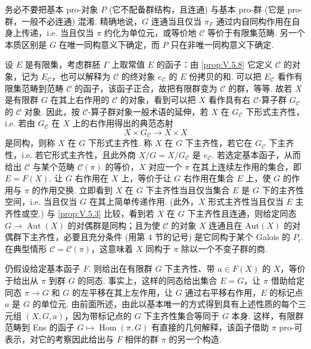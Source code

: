 \begin{remark}\label{rem:V.5.11}
务必不要把基本 pro-对象 $P$ (它不配备群结构，且连通) 与基本 pro-群 (它是 pro-群，一般不必连通) 混淆. 精确地说，$G$ 连通当且仅当 $\pi_F$ 通过内自同构作用在自身上传递，i.e. 当且仅当 $\pi$ 约化为单位元，或等价地 $\mathcal{C}$ 等价于有限集范畴. 另一个本质区别是 $G$ 在唯一同构意义下确定，而 $P$ 只在非唯一同构意义下确定.
\end{remark}

设 $E$ 是有限集，考虑群胚 $\Gamma$ 上取常值 $E$ 的函子：由 \ref{prop:V.5.8} 它定义 $\mathcal{C}$ 的对象，记为 $E_{\mathcal{C}}$，也可以解释为 $\mathcal{C}$ 的终对象 $e_{\mathcal{C}}$ 的 $E$ 份拷贝的和. 可以把 $E_{\mathcal{C}}$ 看作有限集范畴到范畴 $\mathcal{C}$ 的函子，该函子正合，故把有限群变为 $\mathcal{C}$ 的群，等等. 故若 $X$ 是有限群 $G$ 在其上右作用的 $\mathcal{C}$ 的对象，看到可以把 $X$ 看作具有右 $\mathcal{C}$-算子群 $G_{\mathcal{C}}$ 的 $\mathcal{C}$ 对象. 因此，按 $\mathcal{C}$-算子群对象一般术语的延伸，若 $X$ 在 $G_{\mathcal{C}}$ 下形式主齐性，i.e. 若由 $G_{\mathcal{C}}$ 在 $X$ 上的右作用得出的典范态射
\[
X \times G_{\mathcal{C}} \longrightarrow X \times X
\]
是同构，则称 $X$ 在 $G$ 下形式主齐性. 称 $X$ 在 $G$ 下主齐性，若它在 $G_{\mathcal{C}}$ 下主齐性，i.e. 若它形式主齐性，且此外商 $X/G = X/G_{\mathcal{C}}$ 是 $e_{\mathcal{C}}$. 若选定基本函子，从而给出 $\mathcal{C}$ 与某个范畴 $\mathcal{C}(\pi)$ 的等价，$X$ 对应一个 $\pi$ 在其上连续左作用的集合，即 $E = F(X)$. 让 $G$ 右作用在 $X$ 上，等价于让 $G$ 右作用在集合 $E$ 上，使 $G$ 的作用与 $\pi$ 的作用交换. 立即看到 $X$ 在 $G$ 下主齐性当且仅当集合 $E$ 是 $G$ 下的主齐性空间，i.e. 当且仅当 $G$ 在其上简单传递作用. (此外，$X$ 形式主齐性当且仅当 $E$ 主齐性或空.) 与 \ref{prop:V.5.3} 比较，看到若 $X$ 在 $G$ 下主齐性且连通，则给定同态 $G \to \operatorname{Aut}(X)$ 的对偶群是同构；且为使 $\mathcal{C}$ 的对象 $X$ 连通且在 $\mathrm{Aut}(X)$ 的对偶群下主齐性，必要且充分条件 (用第 4 节的记号) 是它同构于某个 Galois 的 $P_i$. 在典型情形 $\mathcal{C} = \mathcal{C}(\pi)$，这意味着 $X$ 同构于 $\pi$ 除以一个不变子群的商.

仍假设给定基本函子 $F$. 则给出在有限群 $G$ 下主齐性、带 $a \in F(X)$ 的 $X$，等价于给出从 $\pi$ 到群 $G$ 的同态. 事实上，这样的同态给出集合 $E = G$，让 $\pi$ 借助给定同态 $\pi \to G$ 和 $G$ 的左平移在其上左作用，让 $G$ 通过右平移右作用，$E$ 的标记点 $a$ 是 $G$ 的单位元. 由前面所述，由此以基本唯一的方式得到具有上述性质的每个三元组 $(X, G, a)$，因为带标记点的 $G$ 下主齐性集合等同于 $G$ 本身. 这样，有限群范畴到 Ens 的函子 $G \mapsto \operatorname{Hom}(\pi, G)$ 有直接的几何解释，该函子借助 $\pi$ pro-可表示，对它的考察因此给出与 $F$ 相伴的群 $\pi$ 的另一个构造.

